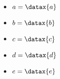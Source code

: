 \documentclass{article}
\begin{document}
\begin{itemize}
    \item \(a = \datax{a}\)
    \item \(b = \datax{b}\)
    \item \(c = \datax{c}\)
    \item \(d = \datax{d}\)
    \item \(e = \datax{e}\)
\end{itemize}
\end{document}
